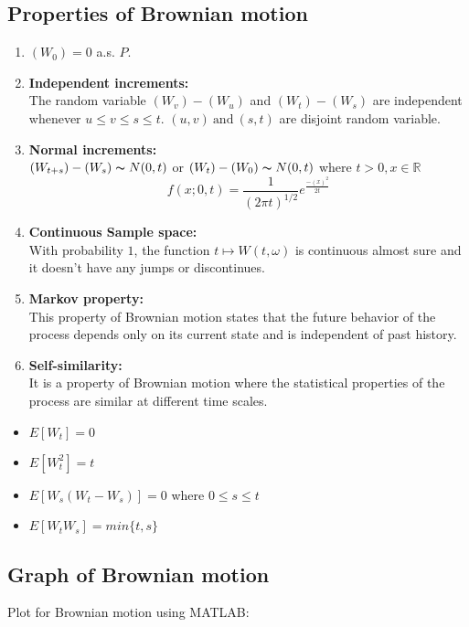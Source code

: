 \documentclass[twoside,final]{hcmut-report}
\begin{document}
\subsection{Properties of Brownian motion}
\begin{enumerate}
    \item $(W_0) = 0$ a.s. $P$.
    \item \textbf{Independent increments:} \\
    The random variable $(W_v)-(W_u)$ and $(W_t)-(W_s)$ are independent whenever $u\leq v \leq s \leq t$. $(u,v) \ \text{and} \  (s,t)$ are disjoint random variable.
    \item \textbf{Normal increments:}\\
    $(W_{t+s})-(W_s)  \thicksim N(0,t)$ or  $(W_{t})-(W_0)  \thicksim N(0,t)$  where $t > 0, x \in \mathbb{R}$ 
    \[ f(x;0,t) = \frac{1}{(2\pi t)^{1/2}} e^{\frac{-(x)^{2}}{2t}}\]
    \item \textbf{Continuous Sample space:}\\
    With probability $1$, the function $t \mapsto W(t,\omega)$ is continuous almost sure and it doesn't have any jumps or discontinues.
    \item \textbf{Markov property:}\\
    This property of Brownian motion states that the future behavior of the process depends only on its current state and is independent of past history.
    \item \textbf{Self-similarity:}\\
    It is a property of Brownian motion where the statistical properties of the process are similar at different time scales.
\end{enumerate}
\begin{itemize}
    \item ${E}[W_t] = 0$
    \item ${E}[W^{2}_{t}] = t$
    \item ${E}[W_s(W_t-W_s)] = 0$ where $0 \leq s \leq t$
    \item ${E}[W_tW_s] = min\{t,s\}$
\end{itemize}
\pagebreak
\subsection{Graph of Brownian motion}
Plot for Brownian motion using MATLAB:
\end{document}
